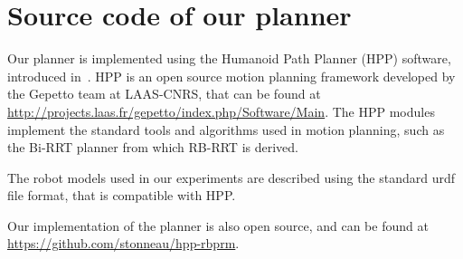\section{Source code of our planner}
\label{app:hpp}
Our planner is implemented using the Humanoid Path Planner (HPP) software, introduced in~\cite{7759083}.
HPP is an open source motion planning framework developed by the Gepetto team at LAAS-CNRS, that can be found at \url{http://projects.laas.fr/gepetto/index.php/Software/Main}.
The HPP modules implement the standard tools and algorithms used in motion planning,
such as the Bi-RRT planner from which RB-RRT is derived.

The robot models used in our experiments are described using the standard urdf file format, that is 
compatible with HPP.

Our implementation of the planner is also open source, and can be found at \url{https://github.com/stonneau/hpp-rbprm}. 
